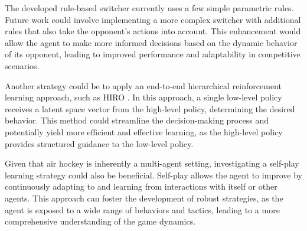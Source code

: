 

The developed rule-based switcher currently uses a few simple parametric rules. 
Future work could involve implementing a more complex switcher with additional rules that also take the opponent's actions into account. 
This enhancement would allow the agent to make more informed decisions based on the dynamic behavior of its opponent, 
leading to improved performance and adaptability in competitive scenarios.

Another strategy could be to apply an end-to-end hierarchical reinforcement learning approach, such as HIRO \cite{HIRO}. 
In this approach, a single low-level policy receives a latent space vector from the high-level policy, determining the desired behavior. 
This method could streamline the decision-making process and potentially yield more efficient and effective learning, 
as the high-level policy provides structured guidance to the low-level policy.

Given that air hockey is inherently a multi-agent setting, investigating a self-play learning strategy could also be beneficial. 
Self-play allows the agent to improve by continuously adapting to and learning from interactions with itself or other agents. 
This approach can foster the development of robust strategies, as the agent is exposed to a wide range of behaviors and tactics, 
leading to a more comprehensive understanding of the game dynamics.

